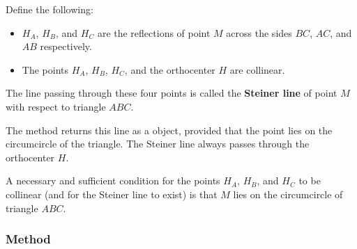\medskip

Define the following:
\begin{itemize}
  \item $H_A$, $H_B$, and $H_C$ are the reflections of point $M$ across the sides $BC$, $AC$, and $AB$ respectively.
  \item The points $H_A$, $H_B$, $H_C$, and the orthocenter $H$ are collinear.
\end{itemize}


The line passing through these four points is called the \textbf{Steiner line} of point $M$ with respect to triangle $ABC$.

\medskip

The method  returns this line as a  object, provided that the point  lies on the circumcircle of the triangle. The Steiner line always passes through the orthocenter $H$.

\medskip

A necessary and sufficient condition for the points $H_A$, $H_B$, and $H_C$ to be collinear (and for the Steiner line to exist) is that $M$ lies on the circumcircle of triangle $ABC$.

\vspace{1em}

\begin{tkzexample}[vbox]
\begin{center}
\end{center}
\end{tkzexample}

\subsubsection{Method } %
\label{ssub:method_triangle_lemoine__line}

